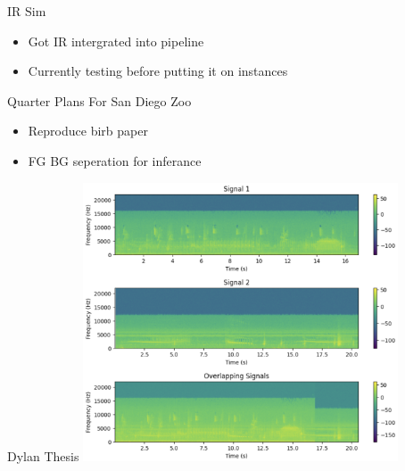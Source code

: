\begin{frame}{IR Sim}
    \begin{itemize}
        \item Got IR intergrated into pipeline
        \item Currently testing before putting it on instances
    \end{itemize}
\end{frame}

\begin{frame}{Quarter Plans For San Diego Zoo}
    \begin{itemize}
        \item Reproduce birb paper
        \item FG BG seperation for inferance
    \end{itemize}
\end{frame}

\begin{frame}{Dylan Thesis}
    \centering
    \includegraphics[height=0.7\textheight,width=0.7\textwidth,keepaspectratio]{dylan-aid-1-24.png}
\end{frame}








